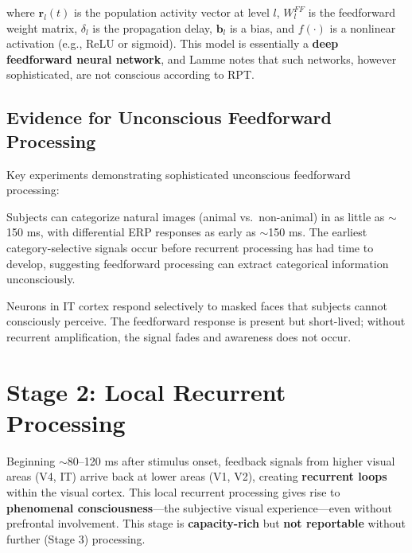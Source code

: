 \documentclass[11pt,a4paper]{report}
\begin{document}
where $\mathbf{r}_l(t)$ is the population activity vector at level $l$, $W_l^{FF}$ is the feedforward weight matrix, $\delta_l$ is the propagation delay, $\mathbf{b}_l$ is a bias, and $f(\cdot)$ is a nonlinear activation (e.g., ReLU or sigmoid). This model is essentially a \textbf{deep feedforward neural network}, and Lamme notes that such networks, however sophisticated, are not conscious according to RPT.

\subsection{Evidence for Unconscious Feedforward Processing}

Key experiments demonstrating sophisticated unconscious feedforward processing:

\begin{examplebox}
Subjects can categorize natural images (animal vs.\ non-animal) in as little as $\sim$150 ms, with differential ERP responses as early as $\sim$150 ms. The earliest category-selective signals occur before recurrent processing has had time to develop, suggesting feedforward processing can extract categorical information unconsciously.
\end{examplebox}

\begin{examplebox}
Neurons in IT cortex respond selectively to masked faces that subjects cannot consciously perceive. The feedforward response is present but short-lived; without recurrent amplification, the signal fades and awareness does not occur.
\end{examplebox}

\section{Stage 2: Local Recurrent Processing}

\begin{stagebox}
Beginning $\sim$80--120 ms after stimulus onset, feedback signals from higher visual areas (V4, IT) arrive back at lower areas (V1, V2), creating \textbf{recurrent loops} within the visual cortex. This local recurrent processing gives rise to \textbf{phenomenal consciousness}---the subjective visual experience---even without prefrontal involvement. This stage is \textbf{capacity-rich} but \textbf{not reportable} without further (Stage 3) processing.
\end{stagebox}
\end{document}

